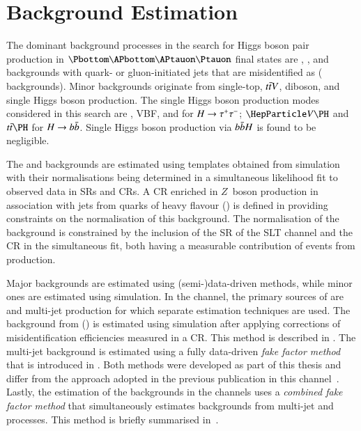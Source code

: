 \section{Background Estimation}%
\label{sec:background_estimation}

The dominant background processes in the search for Higgs boson pair production
in $\bbtautau$ final states are \Zjets, \ttbar, and backgrounds with quark- or
gluon-initiated jets that are misidentified as \tauhadvis (\faketauhadvis
backgrounds).
Minor backgrounds originate from single-top, $t\bar{t} V$, diboson, and single
Higgs boson production.  The single Higgs boson production modes considered in
this search are \ggF, VBF, \VH and \ttH for $H \to \tau^{+} \tau^{-}$; $\VH$ and $\ttH$
for $H \to b\bar{b}$. Single Higgs boson production via $b\bar{b} H$ is found to be
negligible.

The \Zjets and \ttbar backgrounds are estimated using templates obtained from
simulation with their normalisations being determined in a simultaneous
likelihood fit to observed data in SRs and CRs. A CR enriched in $Z$~boson
production in association with jets from quarks of heavy flavour (\ZHF) is
defined in  providing constraints on the normalisation of
this background. The normalisation of the \ttbar background is constrained by
the inclusion of the SR of the \lephad SLT channel and the \ZHF CR in the
simultaneous fit, both having a measurable contribution of events from \ttbar
production.

Major \faketauhadvis backgrounds are estimated using (semi-)data-driven methods,
while minor ones are estimated using simulation. In the \hadhad channel, the
primary sources of \faketauhadvis are \ttbar and multi-jet production for which
separate estimation techniques are used. The \faketauhadvis background from
\ttbar (\ttbarFakes) is estimated using simulation after applying corrections of
\jettotauhadvis misidentification efficiencies measured in a CR. This method is
described in . The multi-jet background is
estimated using a fully data-driven \emph{fake factor method} that is introduced
in . Both methods were developed as part of this thesis
and differ from the approach adopted in the previous publication in this
channel~\cite{HIGG-2016-16-witherratum}. Lastly, the estimation of the
\faketauhadvis backgrounds in the \lephad channels uses a \emph{combined fake
  factor method} that simultaneously estimates \faketauhadvis backgrounds from
multi-jet and \ttbar processes. This method is briefly summarised
in~.

